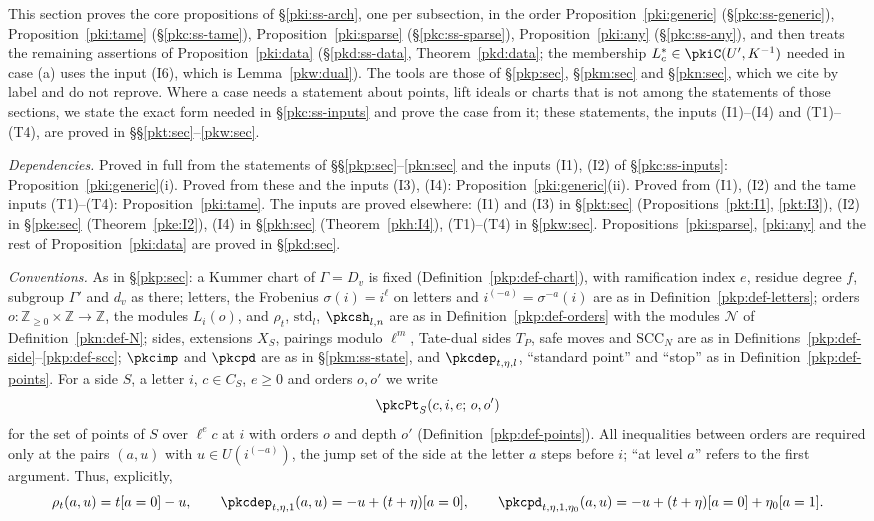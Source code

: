 \documentclass[10pt]{amsart}
\theoremstyle{definition}
\theoremstyle{remark}
\newcommand{\Z}{\mathbb Z}
\begin{document}
This section proves the core propositions of \S\ref{pki:ss-arch}, one per subsection, in the order
Proposition~\ref{pki:generic} (\S\ref{pkc:ss-generic}), Proposition~\ref{pki:tame}
(\S\ref{pkc:ss-tame}), Proposition~\ref{pki:sparse} (\S\ref{pkc:ss-sparse}),
Proposition~\ref{pki:any} (\S\ref{pkc:ss-any}), and then treats the remaining assertions of
Proposition~\ref{pki:data} (\S\ref{pkd:ss-data}, Theorem~\ref{pkd:data}; the membership $L_c^*\in\pkiC(U',K^{-1})$ needed in
case (a) uses the input (I6), which is Lemma~\ref{pkw:dual}). The tools are those of \S\ref{pkp:sec},
\S\ref{pkm:sec} and \S\ref{pkn:sec}, which we cite by label and do not reprove. Where a case needs a
statement about points, lift ideals or charts that is not among the statements of those
sections, we state the exact form needed in \S\ref{pkc:ss-inputs} and prove the case from it; these
statements, the inputs (I1)--(I4) and (T1)--(T4), are proved in \S\S\ref{pkt:sec}--\ref{pkw:sec}.

\emph{Dependencies.} Proved in full from the statements of \S\S\ref{pkp:sec}--\ref{pkn:sec} and the inputs
(I1), (I2) of \S\ref{pkc:ss-inputs}: Proposition~\ref{pki:generic}(i). Proved from these and the
inputs (I3), (I4): Proposition~\ref{pki:generic}(ii). Proved from (I1), (I2) and the tame inputs
(T1)--(T4): Proposition~\ref{pki:tame}. The inputs are proved elsewhere: (I1) and (I3) in
\S\ref{pkt:sec} (Propositions~\ref{pkt:I1}, \ref{pkt:I3}), (I2) in \S\ref{pke:sec}
(Theorem~\ref{pke:I2}), (I4) in \S\ref{pkh:sec} (Theorem~\ref{pkh:I4}), (T1)--(T4) in \S\ref{pkw:sec}.
Propositions~\ref{pki:sparse}, \ref{pki:any} and the rest of Proposition~\ref{pki:data} are proved in
\S\ref{pkd:sec}.

\emph{Conventions.} As in \S\ref{pkp:sec}: a Kummer chart of $\Gamma=D_v$ is fixed
(Definition~\ref{pkp:def-chart}), with ramification index $e$, residue degree $f$, subgroup $\Gamma'$
and $d_v$ as there; letters, the Frobenius $\sigma(i)=i^\ell$ on letters and $i^{(-a)}=\sigma^{-a}(i)$
are as in Definition~\ref{pkp:def-letters}; orders $o\colon\Z_{\ge0}\times\Z\to\Z$, the modules
$L_i(o)$, and $\rho_t$, $\mathrm{std}_l$, $\pkcsh_{l,n}$ are as in Definition~\ref{pkp:def-orders} with
the modules $\mathcal N$ of Definition~\ref{pkn:def-N}; sides, extensions $X_S$, pairings modulo
$\ell^m$, Tate-dual sides $T_P$, safe moves and $\mathrm{SCC}_N$ are as in
Definitions~\ref{pkp:def-side}--\ref{pkp:def-scc}; $\pkcimp$ and $\pkcpd$ are as in
\S\ref{pkm:ss-state}, and $\pkcdep_{t,\eta,l}$, ``standard point'' and ``stop'' as in
Definition~\ref{pkp:def-points}. For a side $S$, a letter $i$, $c\in C_S$, $e\ge0$ and orders $o,o'$
we write
\[
\pkcPt_S(c,i,e;\,o,o')
\]
for the set of points of $S$ over $\ell^ec$ at $i$ with orders $o$ and depth $o'$
(Definition~\ref{pkp:def-points}). All inequalities between orders are required only at the pairs
$(a,u)$ with $u\in U(i^{(-a)})$, the jump set of the side at the letter $a$ steps before $i$; ``at
level $a$'' refers to the first argument. Thus, explicitly,
\[
\rho_t(a,u)=t[a=0]-u,\qquad \pkcdep_{t,\eta,1}(a,u)=-u+(t+\eta)[a=0],\qquad
\pkcpd_{t,\eta,1,\eta_0}(a,u)=-u+(t+\eta)[a=0]+\eta_0[a=1].
\]
\end{document}
